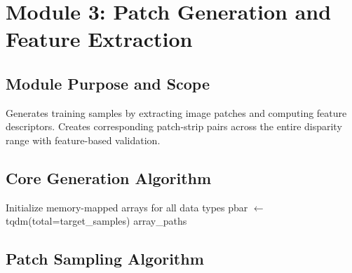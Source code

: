\documentclass[12pt]{article}
\begin{document}
\section{Module 3: Patch Generation and Feature Extraction}

\subsection{Module Purpose and Scope}
Generates training samples by extracting image patches and computing feature descriptors. Creates corresponding patch-strip pairs across the entire disparity range with feature-based validation.

\subsection{Core Generation Algorithm}

\begin{algorithm}[H]
\caption{Patch Generation Main Workflow}
\begin{algorithmic}[1]
\State Initialize memory-mapped arrays for all data types
\State pbar $\gets$ tqdm(total=target\_samples)
\State {}
    \State {}
    \State {}
        \State {}
        \State {}
    \Else
        \State {}
    \EndIf
    \State {}
        \State {}
    \EndIf
\EndFor
\State {}
\State \Return array\_paths
\EndProcedure
\end{algorithmic}
\end{algorithm}

\subsection{Patch Sampling Algorithm}
\end{document}
